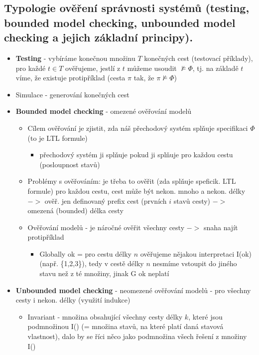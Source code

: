 \documentclass[a4paper,hidelinks]{article}
\begin{document}
\subsection{Typologie ověření správnosti systémů (testing, bounded model checking, unbounded model checking a jejich základní principy).}

\begin{itemize}
    \item \textbf{Testing} - vybíráme konečnou množinu $T$ konečných cest (testovací příklady), pro každé $t\in T$ ověřujeme, jestlí z $t$ můžeme usoudit $\not\models \Phi$, tj. na základě $t$ víme, že existuje protipříklad (cesta $\pi$ tak, že $\pi \not\models \Phi$)
    \item Simulace - generování konečných cest
    \item \textbf{Bounded model checking} - omezené ověřování modelů
    \begin{itemize}
        \item Cílem ověřování je zjistit, zda náš přechodový systém splňuje specifikaci $\Phi$ (to je LTL formule)
        \begin{itemize}
            \item přechodový systém ji splňuje pokud ji splňuje pro každou cestu (posloupnost stavů)
        \end{itemize}
        \item Problémy s ověřováním: je třeba to ověřit (zda splňuje speficik. LTL formule) pro každou cestu, cest může být nekon. mnoho a nekon. délky $->$ ověř. jen definovaný prefix cest (prvních $i$ stavů cesty) $->$ omezená (bounded) délka cesty
        \item Ověřování modelů - je náročné ověřit všechny cesty $->$ snaha najít protipříklad
        \begin{itemize}
            \item Globally ok = pro cestu délky $n$ ověřujeme nějakou interpretaci I(ok) (např. \{1,2,3\}), tedy v cestě délky $n$ nesmíme vstoupit do jiného stavu než z té množiny, jinak G ok neplatí
        \end{itemize}
    \end{itemize}
    \item \textbf{Unbounded model checking} - neomezené ověřování modelů - pro všechny cesty i nekon. délky (využití indukce)
    \begin{itemize}
        \item Invariant - množina obsahující všechny cesty délky $k$, které jsou podmnožinou I() (= množina stavů, na které platí daná stavová vlastnost), dalo by se říci něco jako podmnožina všech řešení z množiny I()

\end{itemize}
\end{itemize}
\end{document}
